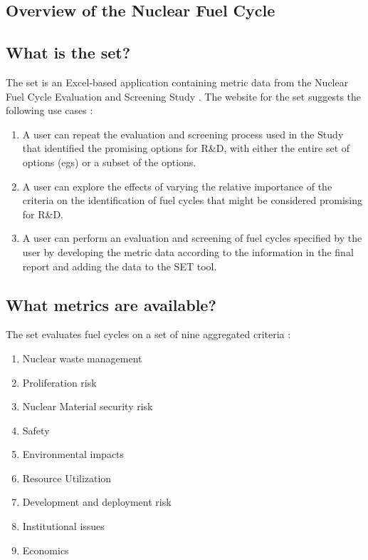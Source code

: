 \subsection{Overview of the Nuclear Fuel Cycle}

\subsection{What is the \ac{set}?}

The \ac{set} is an Excel-based application containing metric data from the Nuclear Fuel Cycle Evaluation and Screening Study
\cite{wigeland_nuclear_2014}. The website for the \ac{set} suggests the following use cases \cite{pincock_screening_2014}:
\begin{enumerate}
    \item A user can repeat the evaluation and screening process used in the Study that identified the promising options for R\&D, with either the entire set of options (\acp{eg}) or a subset of the options.
    \item A user can explore the effects of varying the relative importance of the criteria on the identification of fuel cycles that might be considered promising for R\&D.
    \item A user can perform an evaluation and screening of fuel cycles specified by the user by developing the metric data according to the information in the final report and adding the data to the SET tool.
\end{enumerate}

\subsection{What metrics are available?}

The \ac{set} evaluates fuel cycles on a set of nine aggregated criteria \cite{wigeland_nuclear_2014}:
\begin{enumerate}
    \item Nuclear waste management
    \item Proliferation risk
    \item Nuclear Material security risk
    \item Safety
    \item Environmental impacts
    \item Resource Utilization
    \item Development and deployment risk
    \item Institutional issues
    \item Economics
\end{enumerate}

